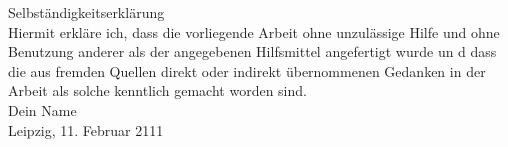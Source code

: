 \vspace*{16.0cm}
\parbox[b]{14.5cm}{
{\Large Selbständigkeitserklärung} \\[5mm]
Hiermit erkläre ich, dass die vorliegende Arbeit ohne unzulässige Hilfe und ohne Benutzung anderer als der angegebenen Hilfsmittel angefertigt wurde un
d dass die aus fremden Quellen direkt oder indirekt übernommenen Gedanken in der Arbeit als solche kenntlich gemacht worden sind. \\[1cm]
Dein Name\\
Leipzig, 11. Februar 2111}
